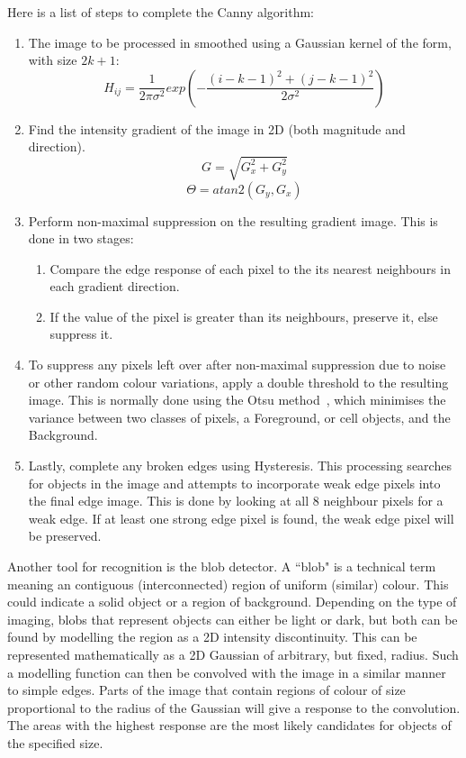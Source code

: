 Here is a list of steps to complete the Canny algorithm:
\begin{enumerate}
	\item The image to be processed in smoothed using a Gaussian kernel of the form, with size $2k + 1$:
	$$ H_{ij} = \frac{1}{2 \pi \sigma^2} exp \left( -\frac{(i - k - 1)^2 + (j - k - 1)^2}{2 \sigma^2} \right) $$
	\item Find the intensity gradient of the image in 2D (both magnitude and direction).
	$$ G = \sqrt{G^2_x + G^2_y} $$
	$$ \Theta = atan2(G_y, G_x) $$
	\item Perform non-maximal suppression on the resulting gradient image. This is done in two stages:
	\begin{enumerate}
		\item Compare the edge response of each pixel to the its nearest neighbours in each gradient direction.
		\item If the value of the pixel is greater than its neighbours, preserve it, else suppress it.
	\end{enumerate}
	\item To suppress any pixels left over after non-maximal suppression due to noise or other random colour variations, apply a double threshold to the resulting image. This is normally done using the Otsu method~\cite{Liao:01}, which minimises the variance between two classes of pixels, a Foreground, or cell objects, and the Background.
	\item Lastly, complete any broken edges using Hysteresis. This processing searches for objects in the image and attempts to incorporate weak edge pixels into the final edge image. This is done by looking at all 8 neighbour pixels for a weak edge. If at least one strong edge pixel is found, the weak edge pixel will be preserved.
\end{enumerate}

Another tool for recognition is the blob detector. A ``blob" is a technical term meaning an contiguous (interconnected) region of uniform (similar) colour. This could indicate a solid object or a region of background. Depending on the type of imaging, blobs that represent objects can either be light or dark, but both can be found by modelling the region as a 2D intensity discontinuity. This can be represented mathematically as a 2D Gaussian of arbitrary, but fixed, radius. Such a modelling function can then be convolved with the image in a similar manner to simple edges. Parts of the image that contain regions of colour of size proportional to the radius of the Gaussian will give a response to the convolution. The areas with the highest response are the most likely candidates for objects of the specified size.

